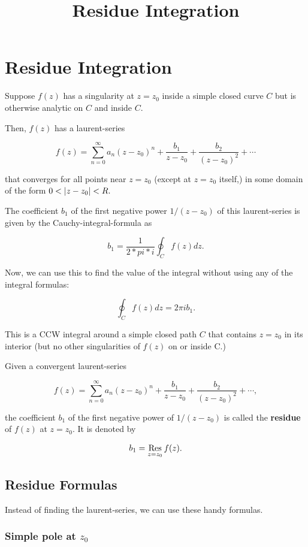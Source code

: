\documentclass{article}
\title{Residue Integration}
\begin{document}
\section{Residue Integration}

Suppose $f(z)$ has a \@{singularity} at $z = z_0$ inside a simple closed curve $C$ but is otherwise \@{analytic} on $C$ and inside $C.$

Then, $f(z)$ has a \@{laurent-series} 

\[ f(z) = \sum_{n=0}^{\infty} a_n (z - z_0)^n + \frac{b_1}{z - z_0} + \frac{b_2}{(z - z_0)^2} + \cdots \]

that \@{converges} for all \@{points} near $z = z_0$ (except at $z = z_0$ itself,) in some \@{domain} of the form $0 < \left| z - z_0 \right| < R.$ 

The coefficient $b_1$ of the first negative power $1/(z - z_0)$ of this \@{laurent-series} is given by the \@{Cauchy-integral-formula} as

\[ b_1 = \frac{1}{2 * pi * i} \oint_C f(z) dz. \]

Now, we can use this to find the value of the integral without using any of the integral formulas:

\[ \oint_C f(z) dz = 2 \pi i b_1. \]

This is a CCW integral around a simple closed path $C$ that contains $z = z_0$ in its interior (but no other \@{singularities} of $f(z)$ on or inside C.)

\begin{definition}[Residue]
Given a convergent \@{laurent-series}

\[ f(z) = \sum_{n=0}^{\infty} a_n (z - z_0)^n + \frac{b_1}{z - z_0} + \frac{b_2}{(z - z_0)^2} + \cdots, \]

the coefficient $b_1$ of the first negative power of $1/(z - z_0)$ is called the \textbf{residue} of $f(z)$ at $z = z_0.$ It is denoted by

\[ b_1 = \operatorname*{Res}_{z = z_0} f(z). \]
\end{definition}

\subsection{Residue Formulas}

Instead of finding the \@{laurent-series}, we can use these handy formulas.

\subsubsection{Simple pole at $z_0$}
\end{document}
